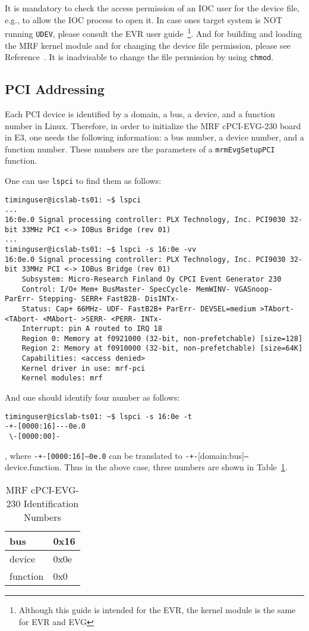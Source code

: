 \documentclass[11pt
  , a4paper
  , article
  , oneside
  , showtrims
]{memoir}
\begin{document}
It is mandatory to check the access permission of an IOC user for the device file, e.g.,  to allow the IOC process to open it. In case ones target system is NOT running \texttt{UDEV}, please consult the EVR user guide~\cite{EVR-USER-GUIDE}\footnote{Although this guide is intended for the EVR, the kernel module is the same for EVR and EVG}. And for building and loading the MRF kernel module and for changing the device file permission, please see Reference~\citep[see][p12,13]{EVR-USER-GUIDE}. It is inadvisable to change the file permission by using \texttt{chmod}.

\subsection{PCI Addressing}
Each PCI device is identified by a domain, a bus, a device, and a function number in Linux. Therefore, in order to initialize the MRF cPCI-EVG-230 board in E3, one needs the following information: a bus number, a device number, and a function number. These numbers are the parameters of a \texttt{mrmEvgSetupPCI} function.

One can use \texttt{lspci} to find them as follows:
\begin{lstlisting}[style=termstyle]
timinguser@icslab-ts01: ~$ lspci
...
16:0e.0 Signal processing controller: PLX Technology, Inc. PCI9030 32-bit 33MHz PCI <-> IOBus Bridge (rev 01)
...
timinguser@icslab-ts01: ~$ lspci -s 16:0e -vv
16:0e.0 Signal processing controller: PLX Technology, Inc. PCI9030 32-bit 33MHz PCI <-> IOBus Bridge (rev 01)
	Subsystem: Micro-Research Finland Oy CPCI Event Generator 230
	Control: I/O+ Mem+ BusMaster- SpecCycle- MemWINV- VGASnoop- ParErr- Stepping- SERR+ FastB2B- DisINTx-
	Status: Cap+ 66MHz- UDF- FastB2B+ ParErr- DEVSEL=medium >TAbort- <TAbort- <MAbort- >SERR- <PERR- INTx-
	Interrupt: pin A routed to IRQ 18
	Region 0: Memory at f0921000 (32-bit, non-prefetchable) [size=128]
	Region 2: Memory at f0910000 (32-bit, non-prefetchable) [size=64K]
	Capabilities: <access denied>
	Kernel driver in use: mrf-pci
	Kernel modules: mrf

\end{lstlisting}

And one should identify four number as follows:
\begin{lstlisting}[style=termstyle]
timinguser@icslab-ts01: ~$ lspci -s 16:0e -t
-+-[0000:16]---0e.0
 \-[0000:00]-

\end{lstlisting}
, where \texttt{-+-[0000:16]---0e.0} can be translated to \texttt{-+-}[domain:bus]\texttt{---}device.function. Thus in the above case, three numbers are shown in Table~\ref{table:pciidnumber}.\begin{table}[!htb]
  \centering
  \begin{tabular}{l|l}
    \toprule
    bus      & 0x16 \\\midrule
    device   & 0x0e \\\midrule
    function & 0x0 \\\bottomrule
  \end{tabular}
  \caption[]{MRF cPCI-EVG-230 Identification Numbers}
  \label{table:pciidnumber}
\end{table}
\end{document}
